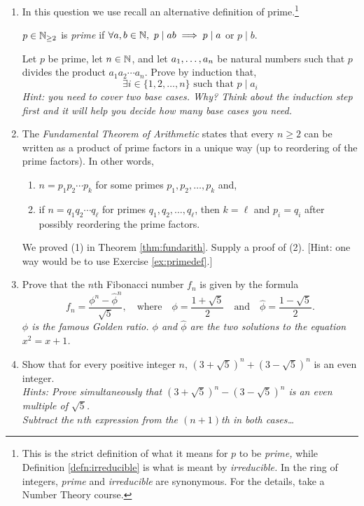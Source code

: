 \begin{exercises}{}{}
\begin{enumerate}
	\item In this question we use recall an alternative definition of prime.\footnote{This is the strict definition of what it means for $p$ to be \emph{prime,} while Definition \ref{defn:irreducible} is what is meant by \emph{irreducible.} In the ring of integers, \emph{prime} and \emph{irreducible} are synonymous. For the details, take a Number Theory course.}
	\begin{defn*}{}{}
		$p\in\mathbb{N}_{\ge 2}$ is \emph{prime} if $\forall a,b\in\mathbb{N},\ p\mid ab\implies p\mid a$ or $p\mid b$.
	\end{defn*}
	Let $p$ be prime, let $n\in\mathbb{N}$, and let ${a}_1,\ldots,{a}_{n}$ be natural numbers such that $p$ divides the product $a_1a_2\cdots a_n$. Prove by induction that,
	\[
		\exists i\in\{1,2,\ldots,n\}\text{ such that }p\mid a_i
	\]
  \emph{Hint: you need to cover \emph{two} base cases. Why? Think about the induction step first and it will help you decide how many base cases you need.}
  
  
    
  \item The \emph{Fundamental Theorem of Arithmetic} states that every $n \geq 2$ can be written as a product of prime factors in a unique way (up to reordering of the prime factors). In other words, 
\begin{enumerate}
    \item $n = p_1 p_2 \cdots p_k$ for some primes $p_1, p_2, \ldots, p_k$ and,
    \item if $n = q_1 q_2 \cdots q_\ell$ for primes $q_1, q_2, \ldots, q_\ell$, then $k = \ell$ and $p_i = q_i$ after possibly reordering the prime factors. 
\end{enumerate}
    We proved (1) in Theorem \ref{thm:fundarith}. Supply a proof of (2). [Hint: one way would be to use Exercise \ref{ex:primedef}.]
	
	\item Prove that the $n$th Fibonacci number $f_n$ is given by the formula
\[f_n=\frac{\phi^n-\hat\phi^n}{\sqrt{5}},\quad\text{where}\quad \phi=\frac{1+\sqrt{5}}2\quad\text{and}\quad\hat\phi=\frac{1-\sqrt{5}}2.\]
\emph{$\phi$ is the famous Golden ratio. $\phi$ and $\hat\phi$ are the two solutions to the equation $x^2=x+1$.}
  
  
	\item Show that for every positive integer $n$, $(3+\sqrt{5})^n + (3-\sqrt{5})^n$ is an even integer.\\
	\emph{Hints: Prove simultaneously that $(3+\sqrt{5})^n-(3-\sqrt{5})^n$ is an even multiple of $\sqrt 5$.\\
	Subtract the $n$th expression from the $(n+1)$th in both cases\ldots}
	

\end{enumerate}
\end{exercises}

